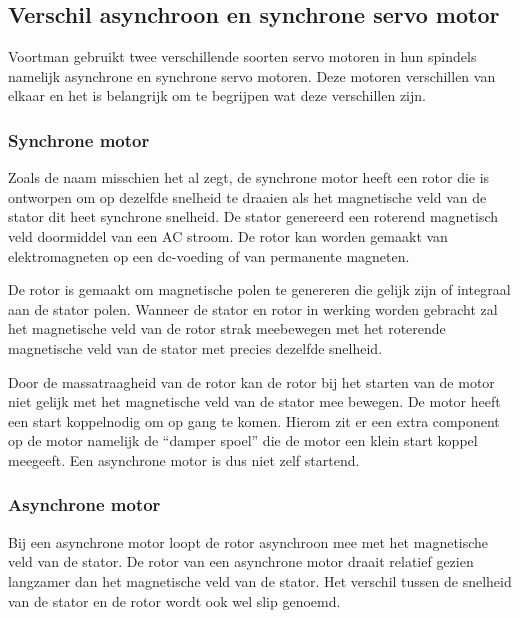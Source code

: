 \subsection{Verschil asynchroon en synchrone servo motor}

Voortman gebruikt twee verschillende soorten servo motoren in hun spindels namelijk asynchrone en synchrone servo motoren. Deze motoren verschillen van elkaar en het is belangrijk om te begrijpen wat deze verschillen zijn.

\subsubsection{Synchrone motor}

Zoals de naam misschien het al zegt, de synchrone motor heeft een rotor die is ontworpen om op dezelfde snelheid te draaien als het magnetische veld van de stator dit heet synchrone snelheid. De stator genereerd een roterend magnetisch veld doormiddel van een \gls{AC} stroom. De rotor kan worden gemaakt van elektromagneten op een dc-voeding of van permanente magneten.

\vspace{0.5cm}

De rotor is gemaakt om magnetische polen te genereren die gelijk zijn of integraal aan de stator polen. Wanneer de stator en rotor in werking worden gebracht zal het magnetische veld van de rotor strak meebewegen met het roterende magnetische veld van de stator met precies dezelfde snelheid.

\vspace{0.5cm}

Door de massatraagheid van de rotor kan de rotor bij het starten van de motor niet gelijk met het magnetische veld van de stator mee bewegen. De motor heeft een start koppelnodig om op gang te komen. Hierom zit er een extra component op de motor namelijk de “damper spoel” die de motor een klein start koppel meegeeft. Een asynchrone motor is dus niet zelf startend. \cite{web:DiffAsyncSync,web:SyncMotor,web:AsyncMotor}


\subsubsection{Asynchrone motor}

Bij een asynchrone motor loopt de rotor asynchroon mee met het magnetische veld van de stator. De rotor van een asynchrone motor draait relatief gezien langzamer dan het magnetische veld van de stator. Het verschil tussen de snelheid van de stator en de rotor wordt ook wel slip genoemd.

